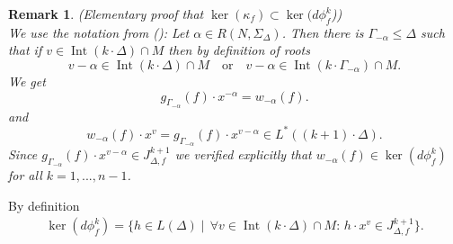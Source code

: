 \documentclass[12pt, english]{article}
\newtheorem{remark}[definition]{Remark}
\DeclareMathOperator{\Int}{Int}
\begin{document}
\begin{remark} \label{remark_kernel_kappa_f_subset_ker_dP_B_f}
	(Elementary proof that $\ker(\kappa_f) \subset \ker(d \phi_{f}^k$)) \\
	\normalfont
	We use the notation from (\cite{Gie22}): Let $\alpha \in R(N,\Sigma_{\Delta})$. Then there is $\Gamma_{-\alpha} \leq \Delta$ such that if $v \in \Int(k \cdot \Delta) \cap M$ then by definition of roots 
	\[ v-\alpha \in \Int(k \cdot \Delta) \cap M \quad \textrm{or} \quad v-\alpha \in \Int(k \cdot \Gamma_{-\alpha}) \cap M.  \]
	We get 
	\[ g_{\Gamma_{-\alpha}}(f) \cdot x^{-\alpha} = w_{-\alpha}(f).  \]
	and
	\[ w_{-\alpha}(f) \cdot x^v = g_{\Gamma_{-\alpha}}(f) \cdot x^{v-\alpha} \in L^*((k+1) \cdot \Delta).  \]
	Since $g_{\Gamma_{-\alpha}}(f) \cdot x^{v-\alpha} \in J_{\Delta,f}^{k+1}$ we verified explicitly that $w_{-\alpha}(f) \in \ker(d \phi_{f}^k)$ for all $k=1,...,n-1$. 
\end{remark}


By definition 
	\begin{align} \label{general_formula_for_ker_DP_MDelta_not_handable}
		\ker(d \phi_{f}^k) = \{ h \in L(\Delta) \mid \, \forall v \in \Int(k \cdot \Delta) \cap M: \, h \cdot x^v \in J_{\Delta,f}^{k+1} \}.
	\end{align}
\end{document}
